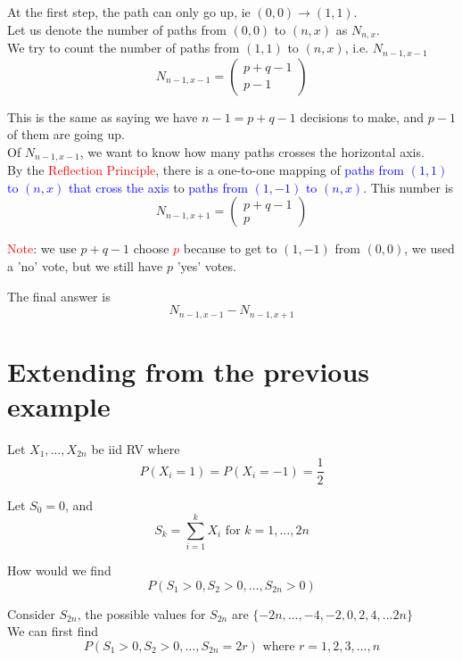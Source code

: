 At the first step, the path can only go up, ie $(0, 0) \rightarrow (1, 1)$. \\

Let us denote the number of paths from  $(0, 0)$ to $(n, x)$ as $N_{n, x}$. \\

We try to count the number of paths from $(1, 1)$ to $(n, x)$, i.e.  $N_{n-1, x-1}$ 
\[
   N_{n-1, x-1} = \begin{pmatrix} p + q - 1 \\ p - 1 \end{pmatrix} 
\] 

This is the same as saying we have $n - 1 = p + q - 1$ decisions to make, and $p - 1$ of them are going up. \\ 

Of $N_{n -1, x-1}$, we want to know how many paths crosses the horizontal axis. \\

By the \textcolor{red}{Reflection Principle}, there is a one-to-one mapping of \textcolor{blue}{paths from $(1, 1)$ to $(n, x)$ that cross the axis}  to \textcolor{blue}{paths from $(1, -1)$ to  $(n, x)$}. This number is 
\[
   N_{n -1, x + 1} = \begin{pmatrix}  p + q -1 \\ p \end{pmatrix} 
\] 

\textcolor{red}{Note}: we use $p + q - 1$ choose \textcolor{red}{$p$} because to get to  $(1, -1)$ from $(0, 0)$, we used a 'no' vote, but we still have $p$ 'yes' votes.

The final answer is 
\[
   N_{n -1, x - 1} - N_{n -1, x + 1}
\] 

\section{Extending from the previous example}
Let $X_1, \hdots, X_{2n}$ be iid RV where 
\[
  P(X_i = 1) = P(X_i = -1) = \frac{1}{2}
\] 

Let $S_0 = 0$, and
\[
   S_k = \sum_{i = 1}^{k} X_i \text{ for } k = 1, \hdots, 2n
\] 

How would we find
\[
   P(S_1 > 0, S_2 > 0, \hdots, S_{2n} > 0)
\] 

Consider $S_{2n}$, the possible values for $S_{2n}$ are $\{ -2n, \hdots, -4, -2, 0, 2, 4, \hdots 2n \} $ \\

We can first find
\[
   P(S_1 > 0, S_2 > 0, \hdots, S_{2n} = 2r ) \text{ where } r = 1, 2, 3, \hdots, n
\] 

